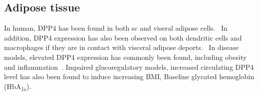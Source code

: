 \subsection{Adipose tissue}
In human, DPP4 has been found in both sc and viseral adipose cells.~\cite{Lamers2011} In addition, DPP4 expression has also been observed on both dendritic cells and macrophages if they are in contact with visceral adipose deports.~\cite{Zhong2013} In disease models, elevated DPP4 expression has commonly been found, including obesity and inflammation~\cite{Zhong2013}. Impaired glucoregulatory models, increased circulating DPP4 level has also been found to induce increasing BMI, Baseline glycated hemoglobin (HbA\textsubscript{1c}). 